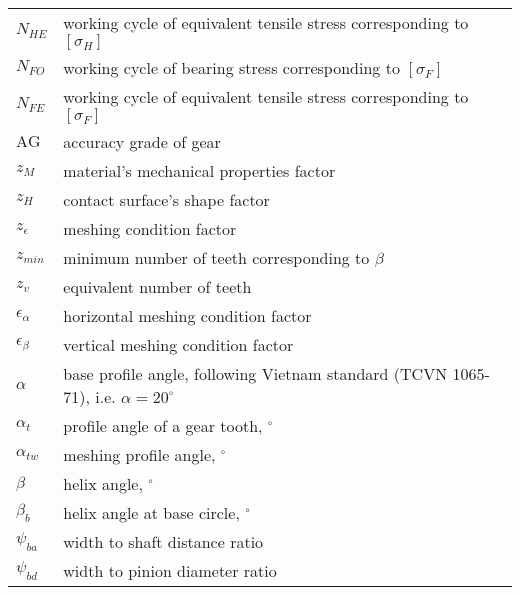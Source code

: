 \begin{tabular}[t]{lp{7cm}}
	$ N_{HE} $ & working cycle of equivalent tensile stress corresponding to $ [\sigma_H] $\\
	$ N_{FO} $ & working cycle of bearing stress corresponding to $ [\sigma_F] $\\
	$ N_{FE} $ & working cycle of equivalent tensile stress corresponding to $ [\sigma_F] $\\
	$ \text{AG} $ & accuracy grade of gear\\
	$ z_M $ & material's mechanical properties factor \\
	$ z_H $ & contact surface's shape factor\\
	$ z_\epsilon $ & meshing condition factor\\
	$ z_{min} $ & minimum number of teeth corresponding to $ \beta $\\
	$ z_v $ & equivalent number of teeth\\
	$ \epsilon_\alpha $ & horizontal meshing condition factor\\
	$ \epsilon_\beta $ & vertical meshing condition factor\\
	$ \alpha $ & base profile angle, following Vietnam standard (TCVN 1065-71), i.e. $ \alpha = 20^\circ $\\
	$ \alpha_t $ & profile angle of a gear tooth, $ ^\circ $\\
	$ \alpha_{tw} $ & meshing profile angle, $ ^\circ $\\
	$ \beta $ & helix angle, $ ^\circ $\\
	$ \beta_b $ & helix angle at base circle, $ ^\circ $\\
	$ \psi_{ba} $ & width to shaft distance ratio\\
	$ \psi_{bd} $ & width to pinion diameter ratio\\
\end{tabular}
